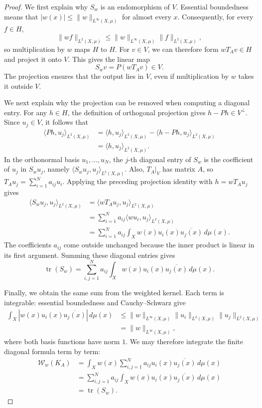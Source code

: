 \begin{proof}
We first explain why $S_w$ is an endomorphism of $V$. Essential boundedness means that $|w(x)|\leq\|w\|_{L^\infty(X,\mu)}$ for almost every $x$. Consequently, for every $f\in H$,
\[
\|wf\|_{L^2(X,\mu)}
\leq\|w\|_{L^\infty(X,\mu)}\|f\|_{L^2(X,\mu)},
\]
so multiplication by $w$ maps $H$ to $H$. For $v\in V$, we can therefore form $wT_Av\in H$ and project it onto $V$. This gives the linear map
\[
S_wv=P(wT_Av)\in V.
\]
The projection ensures that the output lies in $V$, even if multiplication by $w$ takes it outside $V$.

We next explain why the projection can be removed when computing a diagonal entry. For any $h\in H$, the definition of orthogonal projection gives $h-Ph\in V^\perp$. Since $u_j\in V$, it follows that
\[
\begin{aligned}
\langle Ph,u_j\rangle_{L^2(X,\mu)}
&=\langle h,u_j\rangle_{L^2(X,\mu)}
-\langle h-Ph,u_j\rangle_{L^2(X,\mu)}\\
&=\langle h,u_j\rangle_{L^2(X,\mu)}.
\end{aligned}
\]
In the orthonormal basis $u_1,\ldots,u_N$, the $j$-th diagonal entry of $S_w$ is the coefficient of $u_j$ in $S_wu_j$, namely $\langle S_wu_j,u_j\rangle_{L^2(X,\mu)}$. Also, $T_A|_V$ has matrix $A$, so $T_Au_j=\sum_{i=1}^N a_{ij}u_i$. Applying the preceding projection identity with $h=wT_Au_j$ gives
\[
\begin{aligned}
\langle S_wu_j,u_j\rangle_{L^2(X,\mu)}
&=\langle wT_Au_j,u_j\rangle_{L^2(X,\mu)}\\
&=\sum_{i=1}^N a_{ij}\langle wu_i,u_j\rangle_{L^2(X,\mu)}\\
&=\sum_{i=1}^N a_{ij}
\int_X w(x)u_i(x)\overline{u_j(x)}\,d\mu(x).
\end{aligned}
\]
The coefficients $a_{ij}$ come outside unchanged because the inner product is linear in its first argument. Summing these diagonal entries gives
\[
\operatorname{tr}(S_w)
=\sum_{i,j=1}^N a_{ij}
\int_X w(x)u_i(x)\overline{u_j(x)}\,d\mu(x).
\]

Finally, we obtain the same sum from the weighted kernel. Each term is integrable: essential boundedness and Cauchy--Schwarz give
\[
\begin{aligned}
\int_X|w(x)u_i(x)\overline{u_j(x)}|\,d\mu(x)
&\leq\|w\|_{L^\infty(X,\mu)}
\|u_i\|_{L^2(X,\mu)}\|u_j\|_{L^2(X,\mu)}\\
&=\|w\|_{L^\infty(X,\mu)},
\end{aligned}
\]
where both basis functions have norm $1$. We may therefore integrate the finite diagonal formula term by term:
\[
\begin{aligned}
\mathcal W_w(K_A)
&=\int_X w(x)\sum_{i,j=1}^N a_{ij}u_i(x)\overline{u_j(x)}\,d\mu(x)\\
&=\sum_{i,j=1}^N a_{ij}
\int_X w(x)u_i(x)\overline{u_j(x)}\,d\mu(x)\\
&=\operatorname{tr}(S_w).
\end{aligned}
\]
\end{proof}

